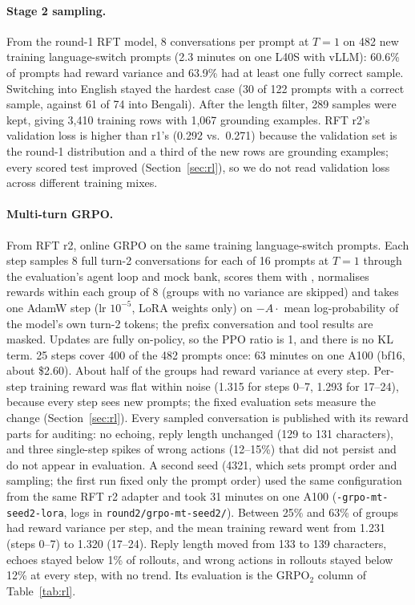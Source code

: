 \paragraph{Stage 2 sampling.} From the round-1 RFT model, 8 conversations per prompt at $T{=}1$ on 482 new training
language-switch prompts (2.3 minutes on one L40S with vLLM): 60.6\% of prompts had reward variance and 63.9\% had at
least one fully correct sample. Switching into English stayed the hardest case (30 of 122 prompts with a correct
sample, against 61 of 74 into Bengali). After the length filter, 289 samples were kept, giving 3,410 training rows with
1,067 grounding examples. RFT r2's validation loss is higher than r1's (0.292 vs.\ 0.271) because the validation
set is the round-1 distribution and a third of the new rows are grounding examples; every scored test improved
(Section~\ref{sec:rl}), so we do not read validation loss across different training mixes.

\paragraph{Multi-turn GRPO.} From RFT r2, online GRPO \citep{shao2024deepseekmath} on the same training
language-switch prompts. Each step samples 8 full turn-2 conversations for each of 16 prompts at $T{=}1$ through the
evaluation's agent loop and mock bank, scores them with , normalises rewards within each group of 8
(groups with no variance are skipped) and takes one AdamW step (lr $10^{-5}$, LoRA weights only) on
$-A\cdot$ mean log-probability of the model's own turn-2 tokens; the prefix conversation and tool results are masked.
Updates are fully on-policy, so the PPO ratio is 1, and there is no KL term. 25 steps cover 400 of the 482 prompts
once: 63 minutes on one A100 (bf16, about \$2.60). About half of the groups had reward variance at every step. Per-step
training reward was flat within noise (1.315 for steps 0--7, 1.293 for 17--24), because every step sees new prompts;
the fixed evaluation sets measure the change (Section~\ref{sec:rl}). Every sampled conversation is published with
its reward parts for auditing: no echoing, reply length unchanged (129 to 131 characters), and three single-step
spikes of wrong actions (12--15\%) that did not persist and do not appear in evaluation.
A second seed (4321, which sets prompt order and sampling; the first run fixed only the prompt order) used the same
configuration from the same RFT r2 adapter and took 31 minutes on one A100
(\texttt{-grpo-mt-seed2-lora}, logs in \texttt{round2/grpo-mt-seed2/}). Between 25\% and 63\% of groups had reward
variance per step, and the mean training reward went from 1.231 (steps 0--7) to 1.320 (17--24). Reply length moved from
133 to 139 characters, echoes stayed below 1\% of rollouts, and wrong actions in rollouts stayed below 12\% at every step,
with no trend. Its evaluation is the GRPO$_2$ column of Table~\ref{tab:rl}.
